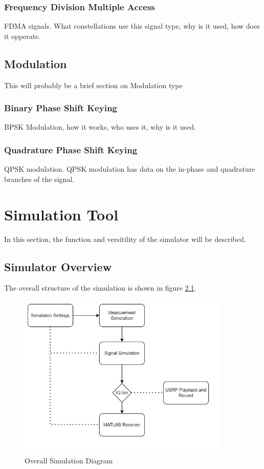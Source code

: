 \documentclass[12pt]{report}
\begin{document}
\subsection{Frequency Division Multiple Access}
FDMA signals. What constellations use this signal type, why is it used, how does it opperate. 

\section{Modulation}
This will probably be a brief section on Modulation type

\subsection{Binary Phase Shift Keying}

BPSK Modulation, how it works, who uses it, why is it used.

\subsection{Quadrature Phase Shift Keying}

QPSK modulation. QPSK modulation has data on the in-phase and quadrature branches of the signal.



\chapter {Simulation Tool}
In this section, the function and versitility of the simulator will be described.

\section{Simulator Overview}

The overall structure of the simulation is shown in figure \ref{fig:SimDiagram}.
\begin{figure}[ht]
    \centering
    \includegraphics[width=4.0in]{OverallSimulationDiagram}
    \caption{Overall Simulation Diagram}
    \label{fig:SimDiagram}
\end{figure}
\end{document}
